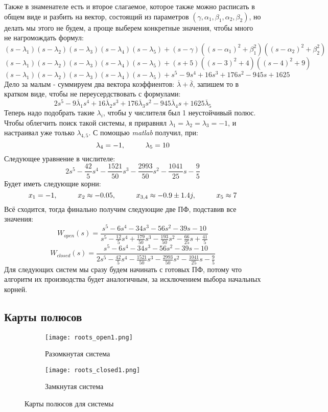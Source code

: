 Также в знаменателе есть и второе слагаемое, которое также можно расписать в общем виде и разбить на вектор, состоящий из параметров $(\gamma, \alpha_1, \beta_1, \alpha_2, \beta_2)$, но делать мы этого не будем, а проще выберем конкретные значения, чтобы много не нагромождать формул:
\small
$$
(s-\lambda_1)(s-\lambda_2)(s-\lambda_3)(s-\lambda_4)(s-\lambda_5) + (s-\gamma)( (s-\alpha_1)^2 +\beta_1^2)( (s-\alpha_2)^2 +\beta_2^2)
$$
$$
(s-\lambda_1)(s-\lambda_2)(s-\lambda_3)(s-\lambda_4)(s-\lambda_5) + (s+5)( (s-3)^2 + 4 )( (s-4)^2 + 9)
$$
$$
(s-\lambda_1)(s-\lambda_2)(s-\lambda_3)(s-\lambda_4)(s-\lambda_5) + s^5 -9s^4 + 16s^3 +176s^2 -945s + 1625
$$
\normalsize
Дело за малым - суммируем два вектора коэффиентов: $\overline{\lambda} + \overline{\delta}$, запишем 
то в кратком виде, чтобы не переусердствовать с формулами:
$$
  2s^5 -9\overline{\lambda}_1s^4 + 16\overline{\lambda}_2s^3 +176\overline{\lambda}_3s^2 -945\overline{\lambda}_4s + 1625\overline{\lambda}_5
$$
Теперь надо подобрать такие $\lambda_i$, чтобы у числителя был 1 неустойчивый полюс. 
Чтобы облегчить поиск такой системы, я приравнял $\lambda_1=\lambda_2=\lambda_3=-1$, и настраивал уже только $\lambda_{4,5}$. 
С помощью \textit{matlab} получил, при:
$$
 \lambda_4= -1, \hspace*{1cm} \lambda_5= 10
$$
Следующее уравнение в числителе:
$$
  2s^5 -\frac{42}{5}s^4-\frac{1521}{50}s^3-\frac{2993}{50}s^2-\frac{1041}{25}s-\frac{9}{5}
$$
Будет иметь следующие корни:
$$
  x_1 = -1, \hspace*{1cm} x_2 \approx -0.05 ,\hspace*{1cm} x_{3,4} \approx -0.9 \pm 1.4j, \hspace*{1cm} x_5 \approx 7
$$
Всё сходится, тогда финально получим следующие две ПФ, подставив все значения:
$$
W_{open}(s) = \frac{s^5 -6s^4 -34s^3 -56s^2 -39s-10}{s^5 -\frac{12}{5}s^4+\frac{179}{50}s^3-\frac{193}{50}s^2-\frac{66}{25}s+\frac{41}{5}}
$$
$$
W_{closed}(s) = \frac{s^5 -6s^4 -34s^3 -56s^2 -39s-10}{2s^5 -\frac{42}{5}s^4-\frac{1521}{50}s^3-\frac{2993}{50}s^2-\frac{1041}{25}s-\frac{9}{5}}
$$
Для следующих систем мы сразу будем начинать с готовых ПФ, потому что алгоритм их производства будет аналогичным, за исключением выбора начальных корней.

\subsection{Карты полюсов}
\begin{figure}[h]
  \begin{subfigure}{0.5\textwidth}
    \texttt{[image: roots\_open1.png]} 
    \caption{Разомкнутая система}
  \end{subfigure}
  \begin{subfigure}{0.5\textwidth}
    \texttt{[image: roots\_closed1.png]}
    \caption{Замкнутая система}
  \end{subfigure}
  \caption{Карты полюсов для системы}
\end{figure}

